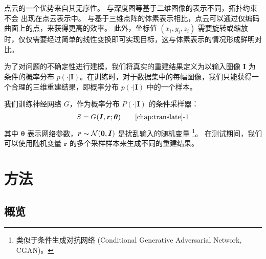 点云的一个优势来自其无序性。 与深度图等基于二维图像的表示不同，拓扑约束不会%
出现在点云表示中。
与基于三维点阵的体素表示相比，点云可以通过仅编码曲面上的点，来获得更高的效率。
此外，坐标值 $(x_i, y_i, z_i)$ 需要旋转或缩放时，仅仅需要经过简单的线性变换即可实现目标，这与体素表示的情况形成鲜明对比。

为了对问题的不确定性进行建模，我们将真实的重建结果定义为以输入图像 $\bm I$ 为条件的概率分布 $p(\cdot | \bm I)$。在训练时，对于数据集中的每幅图像，我们只能获得一个合理的三维重建结果，即概率分布 $p(\cdot | \bm I)$ 中的一个样本。

我们训练神经网络 $G$，作为概率分布 $P(\cdot | \bm I)$ 的条件采样器：
\begin{align}
	S = G(\bm I, \bm r; \bm \theta) \tag*{\ref{chap:translate}-1} \label{eq:translate:psg_network}
\end{align}
其中 $\bm \theta$ 表示网络参数，$\bm r \sim \mathcal{N}(\bm 0, \bm I)$ 是扰乱输入的随机变量
\footnote{类似于条件生成对抗网络 (Conditional Generative Adversarial Network, CGAN)\acite{[17]}。}。
在测试期间，我们可以使用随机变量 $\bm r$ 的多个采样样本来生成不同的重建结果。















\section{方法}
\subsection{概览}

